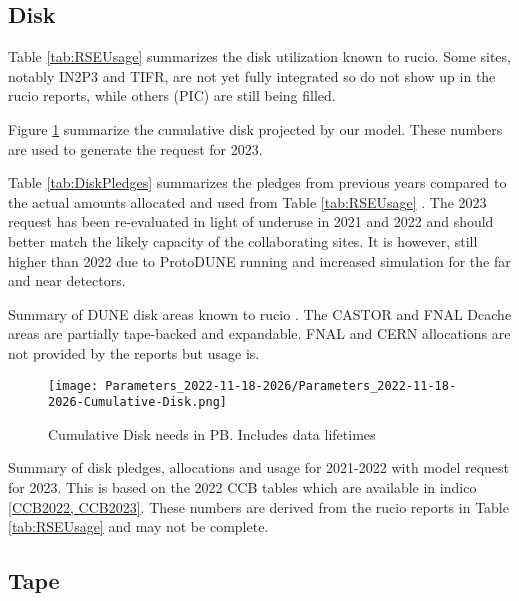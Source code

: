 \documentclass[12pt]{article}
\begin{document}
\subsection{Disk}
Table \ref{tab:RSEUsage} summarizes the disk utilization known to rucio.  Some sites, notably IN2P3 and TIFR, are not yet fully integrated so do not show up in the rucio reports, while others (PIC) are still being filled.

Figure  \ref{fig:Cumulative-Disk}  summarize the cumulative disk projected by our model. These numbers are used to generate the request for 2023. 

Table \ref{tab:DiskPledges} summarizes the pledges from previous years compared to the actual amounts allocated and used from Table \ref{tab:RSEUsage} .   The 2023 request has been re-evaluated in light of underuse in 2021 and 2022 and should better match the likely capacity of the collaborating sites.  It is however, still higher than 2022 due to ProtoDUNE running and increased simulation for the far and near detectors. 

\begin{table}[ht]
\centering{}
\caption{Summary  of DUNE disk areas known to rucio \cite{scotgrid}.  The CASTOR and FNAL Dcache areas are partially tape-backed and expandable. FNAL and CERN allocations are not provided by the reports but usage is.  }
\label{tab:RSEUsage}
\end{table}

\begin{figure}[h]
\centering\texttt{[image: Parameters\_2022-11-18-2026/Parameters\_2022-11-18-2026-Cumulative-Disk.png]}\caption{Cumulative Disk needs in PB. Includes data lifetimes}\label{fig:Cumulative-Disk}
\end{figure}


\begin{table}[ht]
\centering{}
\caption{Summary of disk pledges, allocations and usage for 2021-2022 with model request for 2023.  This is based on the 2022 CCB tables which are available in indico  \ref{CCB2022, CCB2023}.  These numbers are derived from the rucio reports in Table \ref{tab:RSEUsage} and may not be complete. }
\label{tab:DiskPledges}
\end{table}

\subsection{Tape}
\end{document}

